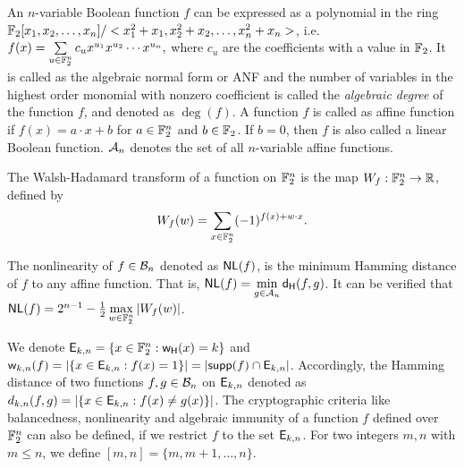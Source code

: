 \documentclass{llncs}
\begin{document}
An $n$-variable Boolean function $f$ can be expressed as a polynomial in the ring $\mathbb{F}_2[x_1,x_2,\ldots,x_n]/<x_1^2+x_1,x_2^2+x_2,\ldots,x_n^2+x_n>$, i.e. 
$f(x) = \sum\limits_{u \in \mathbb{F}_2^n}c_u x^{u_1}x^{u_2}\cdots x^{u_n},$
where $c_u$ are the coefficients with a value in $\mathbb{F}_2$.
It is called as the algebraic normal form or ANF and the number of variables in the highest order monomial with nonzero coefficient is called the \textit{algebraic degree} of the function $f$, and denoted as $\deg(f)$.
A function $f$ is called as affine function if $f(x)= a\cdot x + b$ for $a \in \mathbb{F}_2^n$ and $b \in \mathbb{F}_2$. If $b=0$, then $f$ is also called a linear Boolean function. $\mathcal{A}_n$ denotes the set of all $n$-variable affine functions. 

\begin{definition}\label{def:Walsh}
The Walsh-Hadamard transform of a function on $\mathbb{F}_2^n$ is the map $W_f : \mathbb{F}_2^n \to \mathbb{R}$, defined by \[W_{f}(w)= \sum_{x \in \mathbb{F}_2^n} (-1)^{f(x)+ w \cdot x}.\]
\end{definition}


\begin{definition}[Nonlinearity]\label{def:Nonlinearity}
The nonlinearity of $f \in \mathcal{B}_n$ denoted as $\mathsf{NL}(f)$, is the minimum Hamming distance of $f$ to any affine function. That is, $\mathsf{NL}(f) = \min\limits_{g \in \mathcal{A}_n} \mathsf{d_H}(f,g)$.
It can be verified that $\mathsf{NL}(f) = 2^{n-1} - \frac{1}{2}\max\limits_{w \in \mathbb{F}_2^n} |W_{f}(w)|$.
\end{definition}

We denote $\mathsf{E}_{k,n} = \{x \in \mathbb{F}_2^n : \mathsf{w_H}(x)=k\}$ and $\mathsf{w}_{k,n}(f) = |\{x \in \mathsf{E}_{k,n} : f(x) = 1 \}| = |\mathsf{supp}(f) \cap \mathsf{E}_{k,n}|$. Accordingly, the Hamming distance of two functions $f, g \in \mathcal{B}_n$ on $\mathsf{E}_{k,n}$ denoted as $d_{k,n}(f,g) = |\{x \in \mathsf{E}_{k,n} : f(x) \neq g(x)\}|$. The cryptographic criteria like balancedness, nonlinearity and algebraic immunity of a function $f$ defined over $\mathbb{F}_2^n$ can also be defined, if we restrict $f$ to the set $\mathsf{E}_{k,n}$. For two integers $m, n$ with $m \leq n$, we define $[m,n] = \{m, m+1, \ldots, n\}$.
\end{document}
